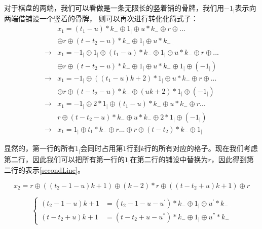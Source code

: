 对于棋盘的两端，我们可以看做是一条无限长的竖着铺的骨牌，我们用$-1_{\vert}$表示向两端借铺设一个竖着的骨牌，
则可以再次进行转化化简式子：
$$
    \begin{aligned}
                    & x_1 = (t_1 - u) * k_{-}  \oplus 1_{\vert} \oplus u * k_{-} \oplus r \oplus ...                                    \\
                    & \oplus r \oplus (t - t_2 - u) * k_{-}  \oplus 1_{\vert} \oplus u * k_{-}                                          \\
        \rightarrow & x_1 = -1_{\vert} \oplus 1_{\vert} \oplus (t_1 - u) * k_{-}  \oplus 1_{\vert} \oplus u * k_{-} \oplus r \oplus ... \\
                    & \oplus r \oplus (t - t_2 - u) * k_{-}  \oplus 1_{\vert} \oplus u * k_{-} \oplus 1_{\vert} \oplus (-1_{\vert})     \\
        \rightarrow & x_1 = -1_{\vert} \oplus ((t_1 - u)k + 2)  * 1_{\vert} \oplus u * k_{-} \oplus r \oplus ...                        \\
                    & \oplus r \oplus (t - t_2 - u) * k_{-}  \oplus  (uk + 2) * 1_{\vert} \oplus (-1_{\vert})                           \\
        \rightarrow & x_1 = -1_{\vert} \oplus 2 * 1_{\vert} \oplus (t_1 - u) * k_{-}  \oplus u * k_{-} \oplus r ...                     \\
                    & r \oplus (t - t_2 - u) * k_{-}  \oplus  u * k_{-} \oplus 2 * 1_{\vert} \oplus (-1_{\vert})                        \\
        \rightarrow & x_1 = 1_{\vert} \oplus  t_1 * k_{-} \oplus r ... \oplus r \oplus (t - t_2) * k_{-} \oplus 1_{\vert}
    \end{aligned}
$$

显然的，第一行的所有$1_{\vert}$会同时占用第$1$行到$k$行的所有对应的格子。现在我们考虑第二行，因此我们可以把所有第一行的$1_{\vert}$在第二行的铺设中替换为$r$，因此得到第二行的表示\ref{secondLine}。

\begin{equation}
    x_2 = r \oplus ((t_2 - 1 - u)k + 1) \oplus (k - 2) * r \oplus ((t - t_2 + u)k + 1) \oplus r
    \label{secondLine}
\end{equation}


$$
    \left\{
    \begin{aligned}
        (t_2 - 1 - u)k + 1 & = (t_2 - 1 - u - u^{'}) * k_{-} \oplus 1_{\vert} \oplus u^{'} *  k_{-}     \\
        (t - t_2 + u)k + 1 & = (t - t_2 + u - u^{''}) *  k_{-} \oplus 1_{\vert} \oplus  u^{''} *  k_{-}
        \label{second-difficult-sep}
    \end{aligned}
    \right.
$$

